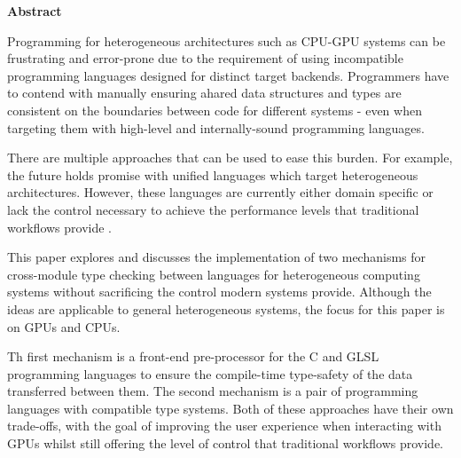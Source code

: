 \newpage
{\Huge \bf Abstract}
\vspace{24pt}






Programming for heterogeneous architectures such as CPU-GPU systems can be
frustrating and error-prone due to the requirement of using incompatible
programming languages designed for distinct target backends. Programmers have
to contend with manually ensuring ahared data structures and types are
consistent on the boundaries between code for different systems - even when
targeting them with high-level and internally-sound programming languages.

There are multiple approaches that can be used to ease this burden. For
example, the future holds promise with unified languages which target
heterogeneous architectures. However, these languages are currently either
domain specific \cite{DSL1} \cite{DSL2} or lack the control necessary to
achieve the performance levels that traditional workflows provide
\cite{Lime2010} \cite{JCUDA2009}.

This paper explores and discusses the implementation of two mechanisms for
cross-module type checking between languages for heterogeneous computing
systems without sacrificing the control modern systems provide. Although the
ideas are applicable to general heterogeneous systems, the focus for this paper
is on GPUs and CPUs.

Th first mechanism is a front-end pre-processor for the C and GLSL programming
languages to ensure the compile-time type-safety of the data transferred
between them. The second mechanism is a pair of programming languages with
compatible type systems. Both of these approaches have their own trade-offs,
with the goal of improving the user experience when interacting with GPUs
whilst still offering the level of control that traditional workflows provide.

\newpage
\vspace*{\fill}
